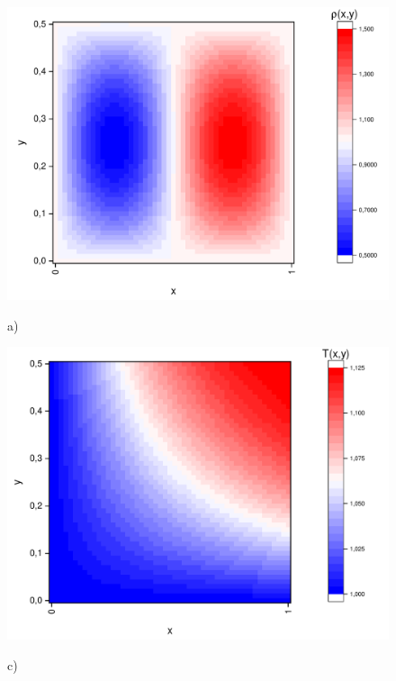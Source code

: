 \documentclass[a4paper,12pt]{article}
\begin{document}
\begin{figure}[h!]
	\begin{center}
		\begin{minipage}[h]{0.23\linewidth}
			\includegraphics[width=\textwidth]{graphs/graphs_a/ro.pdf} \begin{center}	a)	\end{center}
		\end{minipage}
		\begin{minipage}[h]{0.23\linewidth}
			\includegraphics[width=\textwidth]{graphs/graphs_a/T.pdf} \begin{center}	c)	\end{center}
		\end{minipage}

\end{center}
\end{figure}
\end{document}
